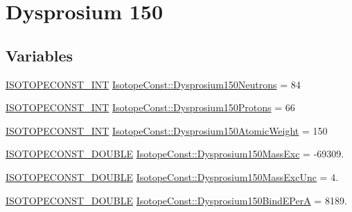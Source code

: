 \hypertarget{group___isotope_const-_dysprosium-_dy150}{}\section{Dysprosium 150}
\label{group___isotope_const-_dysprosium-_dy150}
\subsection*{Variables}
\begin{DoxyCompactItemize}
\item 
\mbox{\hyperlink{group___isotope_const-_macros_ga5f18360b3e99483a35c32d789e62621c}{I\+S\+O\+T\+O\+P\+E\+C\+O\+N\+S\+T\+\_\+\+I\+NT}} \mbox{\hyperlink{group___isotope_const-_dysprosium-_dy150_gad1cccaeb64f8ff819f60783950a1e388}{Isotope\+Const\+::\+Dysprosium150\+Neutrons}} = 84
\item 
\mbox{\hyperlink{group___isotope_const-_macros_ga5f18360b3e99483a35c32d789e62621c}{I\+S\+O\+T\+O\+P\+E\+C\+O\+N\+S\+T\+\_\+\+I\+NT}} \mbox{\hyperlink{group___isotope_const-_dysprosium-_dy150_gab1b06d40345e971525e715dd18fa7468}{Isotope\+Const\+::\+Dysprosium150\+Protons}} = 66
\item 
\mbox{\hyperlink{group___isotope_const-_macros_ga5f18360b3e99483a35c32d789e62621c}{I\+S\+O\+T\+O\+P\+E\+C\+O\+N\+S\+T\+\_\+\+I\+NT}} \mbox{\hyperlink{group___isotope_const-_dysprosium-_dy150_ga6b54d86e3f3b28d0d8cc4af4c23aac63}{Isotope\+Const\+::\+Dysprosium150\+Atomic\+Weight}} = 150
\item 
\mbox{\hyperlink{group___isotope_const-_macros_ga8f45a7272ce02c0b4c65c44636ed719a}{I\+S\+O\+T\+O\+P\+E\+C\+O\+N\+S\+T\+\_\+\+D\+O\+U\+B\+LE}} \mbox{\hyperlink{group___isotope_const-_dysprosium-_dy150_ga066c82cd30a1179e6599e541ec29ced1}{Isotope\+Const\+::\+Dysprosium150\+Mass\+Exc}} = -\/69309.
\item 
\mbox{\hyperlink{group___isotope_const-_macros_ga8f45a7272ce02c0b4c65c44636ed719a}{I\+S\+O\+T\+O\+P\+E\+C\+O\+N\+S\+T\+\_\+\+D\+O\+U\+B\+LE}} \mbox{\hyperlink{group___isotope_const-_dysprosium-_dy150_ga9e96720caffc940b3541a4ebf336437b}{Isotope\+Const\+::\+Dysprosium150\+Mass\+Exc\+Unc}} = 4.
\item 
\mbox{\hyperlink{group___isotope_const-_macros_ga8f45a7272ce02c0b4c65c44636ed719a}{I\+S\+O\+T\+O\+P\+E\+C\+O\+N\+S\+T\+\_\+\+D\+O\+U\+B\+LE}} \mbox{\hyperlink{group___isotope_const-_dysprosium-_dy150_ga55d26d22ea28dbda89c47ced30f71a46}{Isotope\+Const\+::\+Dysprosium150\+Bind\+E\+PerA}} = 8189.
\item 

\end{DoxyCompactItemize}
